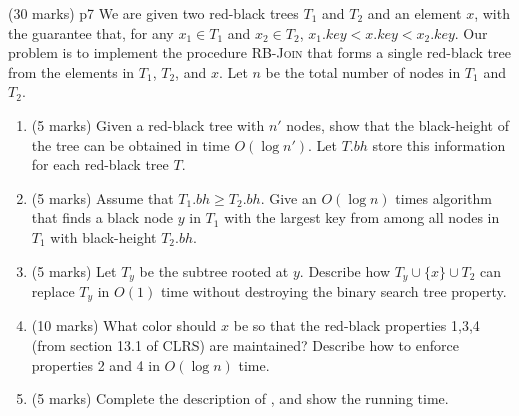 \documentclass[a4paper, 11pt]{article}
\begin{document}


\begin{problem}{%
		\hfill  (30 marks)
	}{p7%
	}
We are given two red-black trees $T_1$ and $T_2$ and an element $x$, with the guarantee that, for
any $x_1 \in T_1$ and $x_2 \in T_2$, $x_1.key < x.key < x_2.key$. Our problem is to implement the
procedure \textsc{RB-Join} that forms a single red-black tree from the elements in $T_1$, $T_2$, and $x$.
Let $n$ be the total number of nodes in $T_1$ and $T_2$.
\begin{enumerate}[label=(\roman*)]
	\item (5 marks) Given a red-black tree with $n'$ nodes, show that the black-height of the tree can be obtained in time $O(\log n')$. Let $T.bh$ store this information for each red-black tree $T$.
	\item (5 marks) Assume that $T_1.bh\geq T_2.bh$. Give an $O(\log n)$ times algorithm that finds a black node $y$ in $T_1$ with the largest key from among all nodes in $T_1$ with black-height $T_2.bh$.
	\item (5 marks) Let $T_y$ be the subtree rooted at $y$. Describe how $T_y\cup \{x\}\cup T_2$ can replace $T_y$ in $O(1)$ time without destroying the binary search tree property. 
	\item (10 marks) What color should $x$ be so that the red-black properties 1,3,4 (from section 13.1 of CLRS) are maintained? Describe how to enforce properties 2 and 4 in $O(\log n)$ time.
	\item (5 marks) Complete the description of , and show the running time.
\end{enumerate}
\end{problem}
\end{document}
